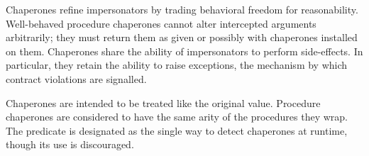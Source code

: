 \documentclass{sigplanconf}
\begin{document}
Chaperones refine impersonators by trading behavioral freedom for reasonability.
Well-behaved procedure chaperones cannot alter intercepted arguments arbitrarily; they must return them as given or possibly with chaperones installed on them.
Chaperones share the ability of impersonators to perform side-effects.
In particular, they retain the ability to raise exceptions, the mechanism by which contract violations are signalled.

Chaperones are intended to be treated like the original value.
Procedure chaperones are considered to have the same arity of the procedures they wrap.
The  predicate is designated as the single way to detect chaperones at runtime, though its use is discouraged.







\end{document}

